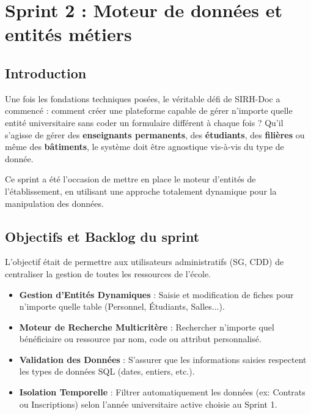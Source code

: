 
\chapter{Sprint 2 : Moteur de données et entités métiers}

\section{Introduction}

Une fois les fondations techniques posées, le véritable défi de SIRH-Doc a commencé : comment créer une plateforme capable de gérer n'importe quelle entité universitaire sans coder un formulaire différent à chaque fois ? Qu'il s'agisse de gérer des \textbf{enseignants permanents}, des \textbf{étudiants}, des \textbf{filières} ou même des \textbf{bâtiments}, le système doit être agnostique vis-à-vis du type de donnée.

Ce sprint a été l'occasion de mettre en place le \og moteur d'entités \fg{} de l'établissement, en utilisant une approche totalement dynamique pour la manipulation des données.

\section{Objectifs et Backlog du sprint}

L'objectif était de permettre aux utilisateurs administratifs (SG, CDD) de centraliser la gestion de toutes les ressources de l'école.

\begin{itemize}
    \item \textbf{Gestion d'Entités Dynamiques} : Saisie et modification de fiches pour n'importe quelle table (Personnel, Étudiants, Salles...).
    \item \textbf{Moteur de Recherche Multicritère} : Rechercher n'importe quel bénéficiaire ou ressource par nom, code ou attribut personnalisé.
    \item \textbf{Validation des Données} : S'assurer que les informations saisies respectent les types de données SQL (dates, entiers, etc.).
    \item \textbf{Isolation Temporelle} : Filtrer automatiquement les données (ex: Contrats ou Inscriptions) selon l'année universitaire active choisie au Sprint 1.
\end{itemize}

